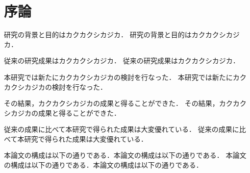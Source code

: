 ﻿%
\chapter{序論}

研究の背景と目的はカクカクシカジカ．
研究の背景と目的はカクカクシカジカ．

従来の研究成果はカクカクシカジカ．
従来の研究成果はカクカクシカジカ．

本研究では新たにカクカクシカジカの検討を行なった．
本研究では新たにカクカクシカジカの検討を行なった．

その結果，カクカクシカジカの成果と得ることができた．
その結果，カクカクシカジカの成果と得ることができた．

従来の成果に比べて本研究で得られた成果は大変優れている．
従来の成果に比べて本研究で得られた成果は大変優れている．

本論文の構成は以下の通りである．本論文の構成は以下の通りである．
本論文の構成は以下の通りである．本論文の構成は以下の通りである．
